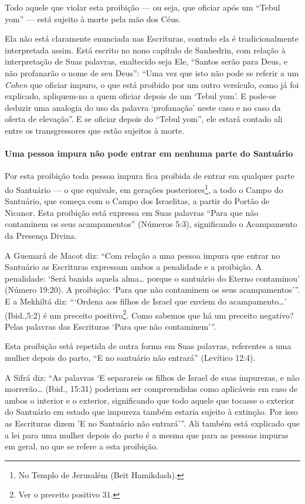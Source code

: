 Todo aquele que violar esta proibição --- ou seja, que oficiar após um
``Tebul yom'' --- está sujeito à morte pela mão dos Céus.

Ela não está claramente enunciada nas Escrituras, contudo ela é
tradicionalmente interpretada assim. Está escrito no nono capítulo de
Sanhedrin, com relação à interpretação de Suas palavras, enaltecido seja
Ele, ``Santos serão para Deus, e não profanarão o nome de seu Deus'': ``Uma vez que isto não
pode se referir a um \textit{Cohen} que oficiar impuro, o que está proibido
por um outro versículo, como já foi explicado, apliquem-no a quem
oficiar depois de um `Tebul yom'. E pode-se deduzir uma analogia do uso
da palavra `profanação' neste caso e no caso da oferta de elevação''. E
se oficiar depois do ``Tebul yom'', ele estará contado ali entre os
transgressores que estão sujeitos à morte.

\paragraph{Uma pessoa impura não pode entrar em nenhuma parte do Santuário}

Por esta proibição toda pessoa impura fica proibida de entrar em
qualquer parte do Santuário --- o que equivale, em gerações
posteriores\footnote{No Templo de Jerusalém (Beit Hamikdash).}, a todo o Campo do Santuário, que
começa com o Campo dos Israelitas, a partir do Portão de Nicanor. Esta
proibição está expressa em Suas palavras ``Para que não contaminem os
seus acampamentos'' (Números 5:3), significando o Acampamento da
Presença Divina.

A Guemará de Macot diz: ``Com relação a uma pessoa impura que entrar no
Santuário as Escrituras expressam ambos a penalidade e a proibição. A
penalidade: `Será banida aquela alma\ldots{} porque o santuário do Eterno
contaminou' (Número 19:20). A proibição: `Para que não contaminem os
seus acampamentos'''. E a Mekhiltá diz: ```Ordena aos filhos de Israel
que enviem do acampamento\ldots{}' (Ibid.,5:2) é um preceito
positivo\footnote{Ver o preceito positivo 31.}. Como sabemos que há um preceito
negativo? Pelas palavras das Escrituras `Para que não contaminem'''.

Esta proibição está repetida de outra forma em Suas palavras, referentes
a uma mulher depois do parto, ``E no santuário não entrará'' (Levítico
12:4).

A Sifrá diz: ``As palavras `E separareis os filhos de Israel de suas
impurezas, e não morrerão\ldots{} (Ibid., 15:31) poderiam ser compreendidas
como aplicáveis em caso de ambos o interior e o exterior, significando
que todo aquele que tocasse o exterior do Santuário em estado que
impureza também estaria sujeito à extinção. Por isso as Escrituras dizem
'E no Santuário não entrará'''. Ali também está explicado que a lei para
uma mulher depois do parto é a mesma que para as pessoas impuras em
geral, no que se refere a esta proibição.

